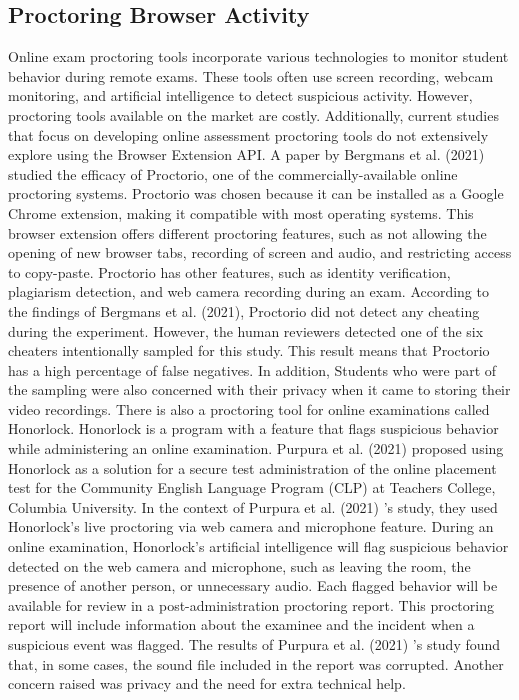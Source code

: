 \documentclass{icsthesis}
\begin{document}
\begin{mainmatter}
\subsection{Proctoring Browser Activity}
Online exam proctoring tools incorporate various technologies to monitor student behavior during remote exams. These tools often use screen recording, webcam monitoring, and artificial intelligence to detect suspicious activity. However, proctoring tools available on the market are costly. Additionally, current studies that focus on developing online assessment proctoring tools do not extensively explore using the Browser Extension API. A paper by Bergmans et al. (2021) studied the efficacy of Proctorio, one of the commercially-available online proctoring systems. Proctorio was chosen because it can be installed as a Google Chrome extension, making it compatible with most operating systems. This browser extension offers different proctoring features, such as not allowing the opening of new browser tabs, recording of screen and audio, and restricting access to copy-paste. Proctorio has other features, such as identity verification, plagiarism detection, and web camera recording during an exam. According to the findings of Bergmans et al. (2021), Proctorio did not detect any cheating during the experiment. However, the human reviewers detected one of the six cheaters intentionally sampled for this study. This result means that Proctorio has a high percentage of false negatives. In addition, Students who were part of the sampling were also concerned with their privacy when it came to storing their video recordings. There is also a proctoring tool for online examinations called Honorlock. Honorlock is a program with a feature that flags suspicious behavior while administering an online examination. Purpura et al. (2021) proposed using Honorlock as a solution for a secure test administration of the online placement test for the Community English Language Program (CLP) at Teachers College, Columbia University. In the context of Purpura et al. (2021) 's study, they used Honorlock's live proctoring via web camera and microphone feature. During an online examination, Honorlock's artificial intelligence will flag suspicious behavior detected on the web camera and microphone, such as leaving the room, the presence of another person, or unnecessary audio. Each flagged behavior will be available for review in a post-administration proctoring report. This proctoring report will include information about the examinee and the incident when a suspicious event was flagged. The results of Purpura et al. (2021) 's study found that, in some cases, the sound file included in the report was corrupted. Another concern raised was privacy and the need for extra technical help.\\


\end{mainmatter}
\end{document}
